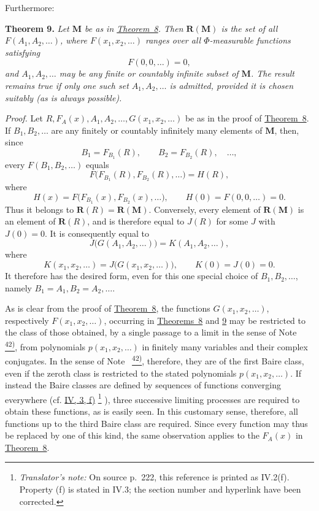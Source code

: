 \documentclass[12pt,b5paper,twoside]{article}
\newcommand{\noteref}[1]{%
  \hyperlink{note:#1}{\textsuperscript{#1)}}}
\newcommand{\translatorfootnote}[2]{%
  \begingroup
  \renewcommand{\thefootnote}{#1}%
  \footnote{\hspace{0.8em}\textit{Translator's note:} #2}%
  \endgroup}
\begin{document}
Furthermore:

\medskip
{}\label{thm:9}
\noindent\textbf{Theorem 9.}
\textit{Let $\mathbf M$ be as in \hyperref[thm:8]{Theorem~8}.  Then
$\mathbf R(\mathbf M)$ is the set of all $F(A_1,A_2,\ldots)$, where
$F(x_1,x_2,\ldots)$ ranges over all $\Phi$-measurable functions satisfying}
\[
 F(0,0,\ldots)=0,
\]
\textit{and $A_1,A_2,\ldots$ may be any finite or countably infinite
subset of $\mathbf M$.  The result remains true if only one such set
$A_1,A_2,\ldots$ is admitted, provided it is chosen suitably (as is always possible).}

\smallskip
\noindent\textit{Proof.}
Let $R,F_A(x),A_1,A_2,\ldots,G(x_1,x_2,\ldots)$ be as in the proof of
\hyperref[thm:8]{Theorem~8}.  If $B_1,B_2,\ldots$ are any finitely or countably
infinitely many elements of $\mathbf M$, then, since
\[
 B_1=F_{B_1}(R),\qquad B_2=F_{B_2}(R),\quad\ldots,
\]
every $F(B_1,B_2,\ldots)$ equals
\[
 F\bigl(F_{B_1}(R),F_{B_2}(R),\ldots\bigr)=H(R),
\]
where
\[
 H(x)=F\bigl(F_{B_1}(x),F_{B_2}(x),\ldots\bigr),
 \qquad H(0)=F(0,0,\ldots)=0.
\]
Thus it belongs to $\mathbf R(R)=\mathbf R(\mathbf M)$.  Conversely, every
element of $\mathbf R(\mathbf M)$ is an element of $\mathbf R(R)$, and is
therefore equal to $J(R)$ for some $J$ with $J(0)=0$.  It is consequently equal to
\[
 J\bigl(G(A_1,A_2,\ldots)\bigr)=K(A_1,A_2,\ldots),
\]
where
\[
 K(x_1,x_2,\ldots)=J\bigl(G(x_1,x_2,\ldots)\bigr),
 \qquad K(0)=J(0)=0.
\]
It therefore has the desired form, even for this one special choice of
$B_1,B_2,\ldots$, namely $B_1=A_1,B_2=A_2,\ldots$.

As is clear from the proof of \hyperref[thm:8]{Theorem~8}, the functions
$G(x_1,x_2,\ldots)$, respectively $F(x_1,x_2,\ldots)$, occurring in
\hyperref[thm:8]{Theorems~8} and \hyperref[thm:9]{9} may be restricted to the class
of those obtained, by a single passage to a limit in the sense of Note~\noteref{42},
from polynomials $p(x_1,x_2,\ldots)$ in finitely many variables and their complex
conjugates.  In the sense of Note~\noteref{42}, therefore, they are of the first Baire
class, even if the zeroth class is restricted to the stated polynomials
$p(x_1,x_2,\ldots)$.  If instead the Baire classes are defined by sequences of
functions converging everywhere (cf. \hyperref[sec:IV.3]{IV, 3, f)}\translatorfootnote{T15}{On source p.~222, this reference is printed as IV.2(f). Property (f) is stated in IV.3; the section number and hyperlink have been corrected.}), three
successive limiting processes are required to obtain these functions, as is easily
seen.  In this customary sense, therefore, all functions up to the third Baire class
are required.  Since every function may thus be replaced by one of this kind, the
same observation applies to the $F_A(x)$ in \hyperref[thm:8]{Theorem~8}.
\end{document}
